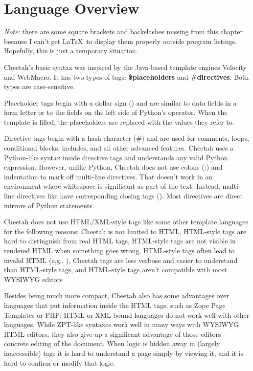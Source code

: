 \section{Language Overview}
\label{language}

{\em Note:} there are some square brackets and backslashes missing from this
chapter because I can't get \LaTeX\ to display them properly outside program
listings.  Hopefully, this is just a temporary situation.

Cheetah's basic syntax was inspired by the Java-based template engines Velocity
and WebMacro. It has two types of tags: {\bf \$placeholders} and {\bf
\#directives}.  Both types are case-sensitive.  

Placeholder tags begin with a dollar sign () and are similar to
data fields in a form letter or to the  fields on the left side
of Python's \code{\%} operator. When the template is filled, the placeholders
are replaced with the values they refer to.

Directive tags begin with a hash character (\#) and are used for comments,
loops, conditional blocks, includes, and all other advanced features. Cheetah
uses a Python-like syntax inside directive tags and understands any valid
Python expression.  However, unlike Python, Cheetah does not use colons (:) and
indentation to mark off multi-line directives.  That doesn't work in an
environment where whitespace is significant as part of the text.  Instead,
multi-line directives like  have  corresponding closing tags
 ().  Most directives are direct mirrors of Python statements.

Cheetah does not use HTML/XML-style tags like some other template languages for
the following reasons:
 Cheetah is not limited to HTML,
 HTML-style tags are hard to distinguish from real HTML tags,
 HTML-style tags are not visible in rendered HTML when something goes wrong,
 HTML-style tags often lead to invalid HTML (e.g., 
),
Cheetah tags are less verbose and easier to understand than HTML-style tags, 
and HTML-style tags aren't compatible with most WYSIWYG editors

Besides being much more compact, Cheetah also has some advantages over
languages that put information inside the HTML tags, such as Zope Page
Templates or PHP:
 HTML or XML-bound languages do not work well with other languages,
 While ZPT-like syntaxes work well in many ways with WYSIWYG HTML editors,
     they also give up a significant advantage of those editors -- concrete
     editing of the document.  When logic is hidden away in (largely
     inaccessible) tags it is hard to understand a page simply by viewing it,
     and it is hard to confirm or modify that logic.

